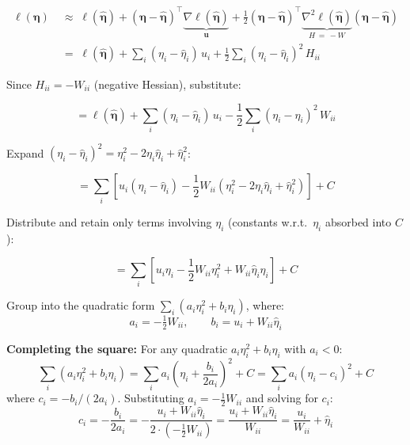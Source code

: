 \documentclass[11pt]{article}
\begin{document}
\begin{derivbox}
\begin{align}
\ell(\bm{\eta})
  &\;\approx\;
  \ell(\hat{\bm{\eta}})
  + (\bm{\eta} - \hat{\bm{\eta}})^{\top}\underbrace{\nabla\ell(\hat{\bm{\eta}})}_{\mathbf{u}}
  + \frac{1}{2}(\bm{\eta} - \hat{\bm{\eta}})^{\top}
    \underbrace{\nabla^2\ell(\hat{\bm{\eta}})}_{H\,=\,-W}
    (\bm{\eta} - \hat{\bm{\eta}}) \label{eq:taylor-vec}\\
  &\;=\;
  \ell(\hat{\bm{\eta}})
  + \sum_i (\eta_i - \hat{\eta}_i)\,u_i
  + \frac{1}{2}\sum_i (\eta_i - \hat{\eta}_i)^2\,H_{ii} \label{eq:taylor-scalar}
\end{align}

Since $H_{ii} = -W_{ii}$ (negative Hessian), substitute:

\begin{equation}
  = \ell(\hat{\bm{\eta}})
  + \sum_i (\eta_i - \hat{\eta}_i)\,u_i
  - \frac{1}{2}\sum_i (\eta_i - \hat{\eta}_i)^2\,W_{ii}
\end{equation}

Expand $(\eta_i - \hat{\eta}_i)^2 = \eta_i^2 - 2\eta_i\hat{\eta}_i + \hat{\eta}_i^2$:

\begin{equation}
  = \sum_i \left[
    u_i(\eta_i - \hat{\eta}_i)
    - \frac{1}{2}W_{ii}\left(\eta_i^2 - 2\eta_i\hat{\eta}_i + \hat{\eta}_i^2\right)
  \right] + C
\end{equation}

Distribute and retain only terms involving $\eta_i$ (constants w.r.t.\ $\eta_i$
absorbed into $C$):

\begin{equation}
  = \sum_i \left[
    u_i\eta_i
    - \frac{1}{2}W_{ii}\eta_i^2
    + W_{ii}\hat{\eta}_i\eta_i
  \right] + C \label{eq:taylor-distributed}
\end{equation}

Group into the quadratic form $\sum_i\!\left(a_i\eta_i^2 + b_i\eta_i\right)$,
where:
\begin{equation}
  a_i = -\tfrac{1}{2}W_{ii}, \qquad b_i = u_i + W_{ii}\hat{\eta}_i
\end{equation}

\textbf{Completing the square:} For any quadratic $a_i\eta_i^2 + b_i\eta_i$
with $a_i < 0$:
\begin{equation}
  \sum_i \left(a_i\eta_i^2 + b_i\eta_i\right)
  = \sum_i a_i\!\left(\eta_i + \frac{b_i}{2a_i}\right)^2 + C
  = \sum_i a_i\!\left(\eta_i - c_i\right)^2 + C
  \label{eq:complete-square-rule}
\end{equation}
where $c_i = -b_i/(2a_i)$.  Substituting $a_i = -\tfrac{1}{2}W_{ii}$ and
solving for $c_i$:
\begin{equation}
  c_i = -\frac{b_i}{2a_i}
      = -\frac{u_i + W_{ii}\hat{\eta}_i}{2 \cdot (-\tfrac{1}{2}W_{ii})}
      = \frac{u_i + W_{ii}\hat{\eta}_i}{W_{ii}}
      = \frac{u_i}{W_{ii}} + \hat{\eta}_i \label{eq:ci-solve}
\end{equation}


\end{derivbox}
\end{document}
